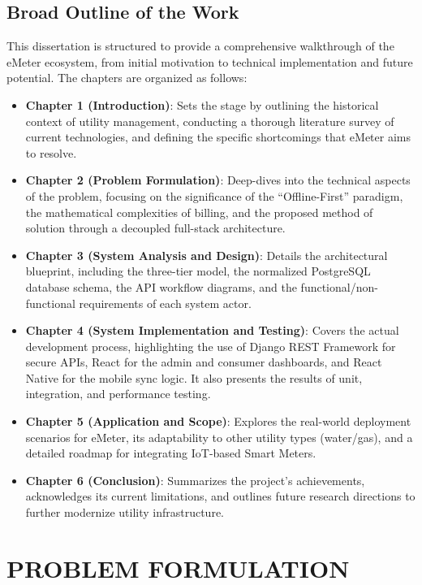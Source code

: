 \documentclass[12pt, a4paper, onecolumn]{report}
\begin{document}
\section{Broad Outline of the Work}
This dissertation is structured to provide a comprehensive walkthrough of the eMeter ecosystem, from initial motivation to technical implementation and future potential. The chapters are organized as follows:
\begin{itemize}
    \item \textbf{Chapter 1 (Introduction)}: Sets the stage by outlining the historical context of utility management, conducting a thorough literature survey of current technologies, and defining the specific shortcomings that eMeter aims to resolve.
    \item \textbf{Chapter 2 (Problem Formulation)}: Deep-dives into the technical aspects of the problem, focusing on the significance of the ``Offline-First'' paradigm, the mathematical complexities of billing, and the proposed method of solution through a decoupled full-stack architecture.
    \item \textbf{Chapter 3 (System Analysis and Design)}: Details the architectural blueprint, including the three-tier model, the normalized PostgreSQL database schema, the API workflow diagrams, and the functional/non-functional requirements of each system actor.
    \item \textbf{Chapter 4 (System Implementation and Testing)}: Covers the actual development process, highlighting the use of Django REST Framework for secure APIs, React for the admin and consumer dashboards, and React Native for the mobile sync logic. It also presents the results of unit, integration, and performance testing.
    \item \textbf{Chapter 5 (Application and Scope)}: Explores the real-world deployment scenarios for eMeter, its adaptability to other utility types (water/gas), and a detailed roadmap for integrating IoT-based Smart Meters.
    \item \textbf{Chapter 6 (Conclusion)}: Summarizes the project's achievements, acknowledges its current limitations, and outlines future research directions to further modernize utility infrastructure.
\end{itemize}


\chapter{PROBLEM FORMULATION}
\end{document}
